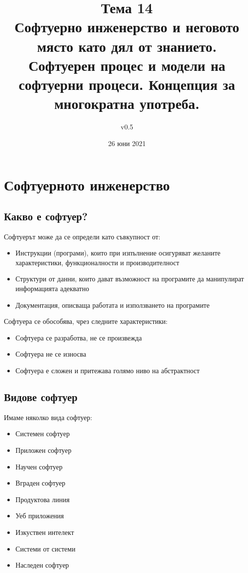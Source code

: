 \documentclass[fleqn,12pt]{article}
\title{Тема 14\\ Софтуерно инженерство и неговото място като дял от знанието. Софтуерен процес и модели на софтуерни процеси. Концепция за многократна употреба.}
\author{v0.5}
\date{26 юни 2021}
\begin{document}
\maketitle

\tableofcontents

\clearpage

\section{Софтуерното  инженерство}
\subsection{Какво  е  софтуер?}
Софтуерът може да се определи като съвкупност от:
\begin{itemize}
	\item Инструкции (програми), които при изпълнение осигуряват желаните характеристики, функционалности и производителност
	\item Структури от данни, които дават възможност на програмите да манипулират информацията адекватно
	\item Документация, описваща работата и използването на програмите
\end{itemize}

Софтуера се обособява, чрез следните характеристики:
\begin{itemize}
	\item Софтуера се разработва, не се произвежда
	\item Софтуера не се износва
	\item Софтуера е сложен и притежава голямо ниво на абстрактност
\end{itemize}

\subsection{Видове  софтуер}
Имаме няколко вида софтуер:
\begin{itemize}
	\item Системен софтуер
	\item Приложен софтуер
	\item Научен софтуер
	\item Вграден софтуер
	\item Продуктова линия
	\item Уеб приложения
	\item Изкуствен интелект
	\item Системи от системи
	\item Наследен софтуер
\end{itemize}
\end{document}

